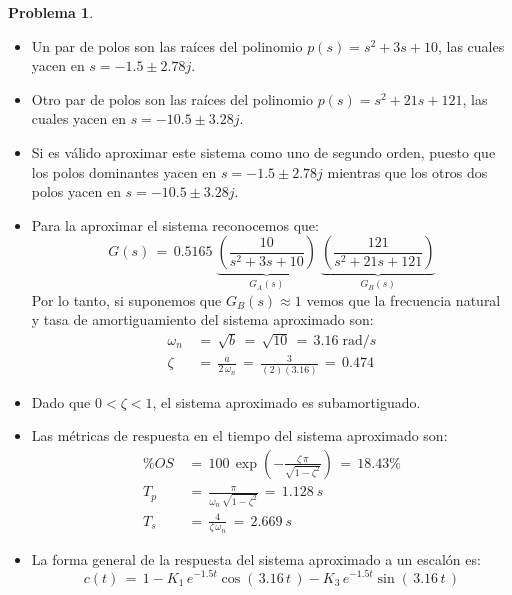\documentclass[ a4paper, twoside, 11pt]{article}
\theoremstyle{definition}
\newtheorem{problem}[definition]{Problema}
\begin{document}
\begin{problem}
\begin{itemize}
\begin{itemize}
\item Un par de polos son las ra\'ices del polinomio $p(s) = s^2 + 3s + 10$, las cuales yacen en $s = -1.5 \pm 2.78j$. 
\item Otro par de polos son las ra\'ices del polinomio $p(s) = s^2 + 21s + 121$, las cuales yacen en $s = -10.5 \pm 3.28j$. 
\item Si es v\'alido aproximar este sistema como uno de segundo orden, puesto que los polos dominantes yacen en $s = -1.5 \pm 2.78j$ mientras que los otros dos polos yacen en $s = -10.5 \pm 3.28j$. 
\item Para la aproximar el sistema reconocemos que: 
\[
G(s) \, = \, 0.5165 \; \underbrace{ \left( \frac{10}{ s^2 + 3s + 10 } \right) }_{ \textstyle G_A(s) } \; \underbrace{ \left( \frac{121}{ s^2 + 21s + 121 } \right) }_{ \textstyle G_B(s) }
\]
Por lo tanto, si suponemos que $G_B(s) \approx 1$ vemos que la frecuencia natural y tasa de amortiguamiento del sistema aproximado son: 
\begin{align*}
\omega_n \, & = \, \sqrt{b} \, = \, \sqrt{10} \, = \, 3.16 \; \text{rad}/s \\
\zeta \,    & = \, \frac{a}{ 2 \, \omega_n } \, = \, \frac{3}{ (2)(3.16) } \, = \, 0.474
\end{align*}
\item Dado que $0 < \zeta < 1$, el sistema aproximado es subamortiguado. 
\item Las m\'etricas de respuesta en el tiempo del sistema aproximado son: 
\begin{align*}
\% OS \, 
& = \, 100 \, \exp \left( -\frac{ \zeta \, \pi }{ \sqrt{1 - \zeta^2} } \right) 
\, = \, 18.43 \% \\[1ex]
T_p \, & = \, \frac{\pi}{ \omega_n \, \sqrt{1 - \zeta^2} } \, = \, 1.128 \: s \\[1ex]
T_s \, & = \, \frac{4}{ \zeta \, \omega_n } \, = \, 2.669 \: s
\end{align*}
\item La forma general de la respuesta del sistema aproximado a un escal\'on es: 
\[
c(t) \, = \, 1 - K_1 \, e^{ -1.5 t } \cos( \, 3.16 \, t \, ) - K_3 \, e^{ -1.5 t } \sin( \, 3.16 \, t \, ) 
\]
\end{itemize}
\end{itemize}
\end{problem}
\vspace{\baselineskip}
\end{document}
